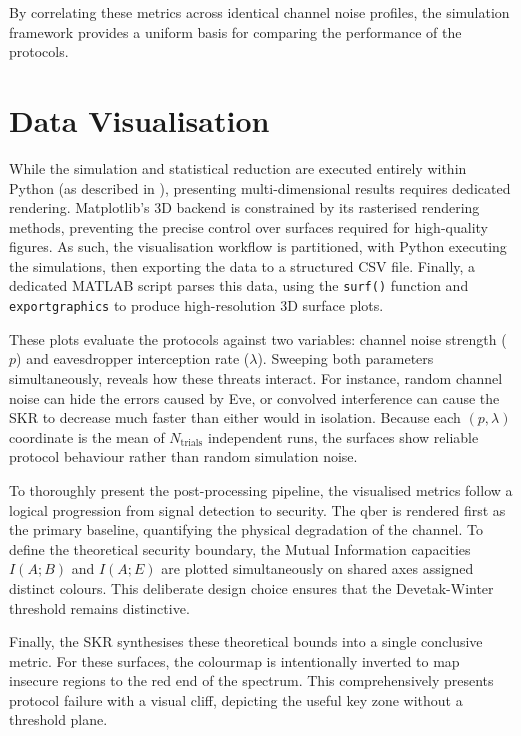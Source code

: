 By correlating these metrics across identical channel noise profiles, the simulation framework provides a uniform basis for comparing the performance of the protocols.




\section{Data Visualisation}
\label{sec:dataviz}

While the simulation and statistical reduction are executed entirely within Python (as described in ), presenting multi-dimensional results requires dedicated rendering. Matplotlib's 3D backend is constrained by its rasterised rendering methods, preventing the precise control over surfaces required for high-quality figures. As such, the visualisation workflow is partitioned, with Python executing the simulations, then exporting the data to a structured CSV file. Finally, a dedicated MATLAB script parses this data, using the \texttt{surf()} function and \texttt{exportgraphics} to produce high-resolution 3D surface plots.

These plots evaluate the protocols against two variables: channel noise strength (\(p\)) and eavesdropper interception rate (\(\lambda\)). Sweeping both parameters simultaneously, reveals how these threats interact. For instance, random channel noise can hide the errors caused by Eve, or convolved interference can cause the SKR to decrease much faster than either would in isolation. Because each \((p, \lambda)\) coordinate is the mean of \(N_{\text{trials}}\) independent runs, the surfaces show reliable protocol behaviour rather than random simulation noise.

To thoroughly present the post-processing pipeline, the visualised metrics follow a logical progression from signal detection to security. The \gls{qber} is rendered first as the primary baseline, quantifying the physical degradation of the channel. To define the theoretical security boundary, the Mutual Information capacities \(I(A;B)\) and \(I(A;E)\) are plotted simultaneously on shared axes assigned distinct colours. This deliberate design choice ensures that the Devetak-Winter threshold remains distinctive.

Finally, the SKR synthesises these theoretical bounds into a single conclusive metric. For these surfaces, the colourmap is intentionally inverted to map insecure regions to the red end of the spectrum. This comprehensively presents protocol failure with a visual cliff, depicting the useful key zone without a threshold plane.


